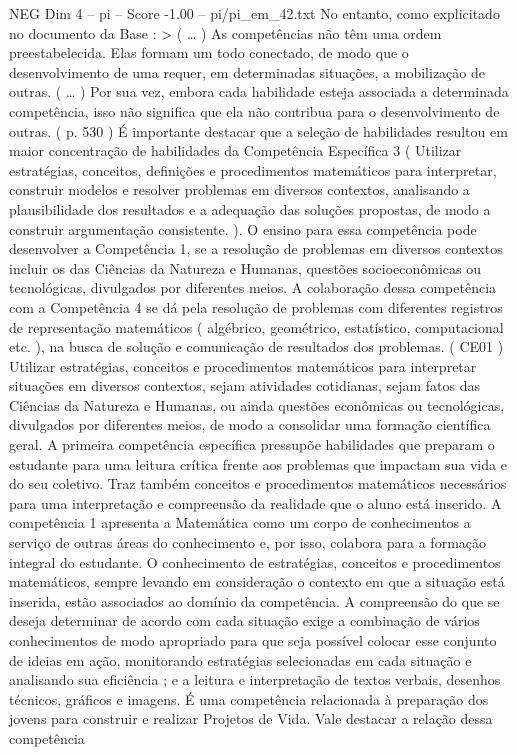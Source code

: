 \begin{textsample}{NEG Dim 4 – pi – Score -1.00 – pi/pi\_em\_42.txt}
No entanto, como explicitado no documento da Base : > ( … ) As competências não têm uma ordem preestabelecida.
Elas formam um todo conectado, de modo que o desenvolvimento de uma requer, em determinadas situações, a mobilização de outras. ( … ) Por sua vez, embora cada habilidade esteja associada a determinada competência, isso não significa que ela não contribua para o desenvolvimento de outras. ( p. 530 ) É importante destacar que a seleção de habilidades resultou em maior concentração de habilidades da Competência Específica 3 ( Utilizar estratégias, conceitos, definições e procedimentos matemáticos para interpretar, construir modelos e resolver problemas em diversos contextos, analisando a plausibilidade dos resultados e a adequação das soluções propostas, de modo a construir argumentação consistente. ).
O ensino para essa competência pode desenvolver a Competência 1, se a resolução de problemas em diversos contextos incluir os das Ciências da Natureza e Humanas, questões socioeconômicas ou tecnológicas, divulgados por diferentes meios.
A colaboração dessa competência com a Competência 4 se dá pela resolução de problemas com diferentes registros de representação matemáticos ( algébrico, geométrico, estatístico, computacional etc. ), na busca de solução e comunicação de resultados dos problemas. ( CE01 ) Utilizar estratégias, conceitos e procedimentos matemáticos para interpretar situações em diversos contextos, sejam atividades cotidianas, sejam fatos das Ciências da Natureza e Humanas, ou ainda questões econômicas ou tecnológicas, divulgados por diferentes meios, de modo a consolidar uma formação científica geral.
A primeira competência específica pressupõe habilidades que preparam o estudante para uma leitura crítica frente aos problemas que impactam sua vida e do seu coletivo.
Traz também conceitos e procedimentos matemáticos necessários para uma interpretação e compreensão da realidade que o aluno está inserido.
A competência 1 apresenta a Matemática como um corpo de conhecimentos a serviço de outras áreas do conhecimento e, por isso, colabora para a formação integral do estudante.
O conhecimento de estratégias, conceitos e procedimentos matemáticos, sempre levando em consideração o contexto em que a situação está inserida, estão associados ao domínio da competência.
A compreensão do que se deseja determinar de acordo com cada situação exige a combinação de vários conhecimentos de modo apropriado para que seja possível colocar esse conjunto de ideias em ação, monitorando estratégias selecionadas em cada situação e analisando sua eficiência ; e a leitura e interpretação de textos verbais, desenhos técnicos, gráficos e imagens.
É uma competência relacionada à preparação dos jovens para construir e realizar Projetos de Vida.
Vale destacar a relação dessa competência

\end{textsample}
